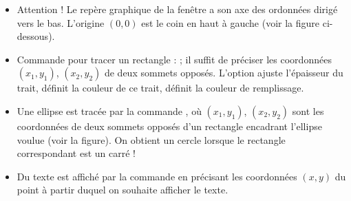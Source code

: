 \documentclass[11pt,class=report,crop=false]{standalone}
\begin{document}
\begin{cours}
\begin{itemize}
    
  \item Attention ! Le repère graphique de la fenêtre a son axe des ordonnées dirigé vers le bas. L'origine $(0,0)$ est le coin en haut à gauche (voir la figure ci-dessous). 
  
  \item Commande pour tracer un rectangle :  ; il suffit de préciser les coordonnées $(x_1,y_1)$, $(x_2,y_2)$ de deux sommets opposés. L'option  ajuste l'épaisseur du trait,  définit la couleur de ce trait,  définit la couleur de remplissage.
  
  \item Une ellipse est tracée par la commande , où $(x_1,y_1)$, $(x_2,y_2)$ sont les coordonnées de deux sommets opposés d'un rectangle encadrant l'ellipse voulue (voir la figure). On obtient un cercle lorsque le rectangle correspondant est un carré !  
  
  \item Du texte est affiché par la commande  en précisant les coordonnées $(x,y)$ du point à partir duquel on souhaite afficher le texte. 
  
\end{itemize}


\end{cours}


\end{document}
